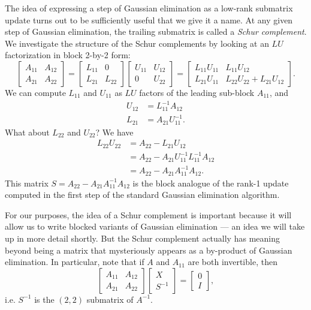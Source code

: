 \documentclass[12pt, leqno]{article} %
\begin{document}
The idea of expressing a step of Gaussian elimination as a low-rank
submatrix update turns out to be sufficiently useful that we give it
a name.  At any given step of Gaussian elimination, the trailing
submatrix is called a {\em Schur complement}.  We investigate the
structure of the Schur complements by looking at an $LU$
factorization in block 2-by-2 form:
\[
  \begin{bmatrix}
    A_{11} & A_{12} \\
    A_{21} & A_{22}
  \end{bmatrix} =
  \begin{bmatrix}
    L_{11} & 0 \\
    L_{21} & L_{22}
  \end{bmatrix}
  \begin{bmatrix}
    U_{11} & U_{12} \\
        0 & U_{22}
  \end{bmatrix} =
  \begin{bmatrix}
    L_{11} U_{11} & L_{11} U_{12} \\
    L_{21} U_{11} & L_{22} U_{22} + L_{21} U_{12}
  \end{bmatrix}.
\]
We can compute $L_{11}$ and $U_{11}$ as $LU$ factors of the leading
sub-block $A_{11}$, and
\begin{align*}
  U_{12} &= L_{11}^{-1} A_{12} \\
  L_{21} &= A_{21} U_{11}^{-1}.
\end{align*}
What about $L_{22}$ and $U_{22}$?  We have
\begin{align*}
  L_{22} U_{22}
  &= A_{22} - L_{21} U_{12} \\
  &= A_{22} - A_{21} U_{11}^{-1} L_{11}^{-1} A_{12} \\
  &= A_{22} - A_{21} A_{11}^{-1} A_{12}.
\end{align*}
This matrix $S = A_{22} - A_{21} A_{11}^{-1} A_{12}$ is the block analogue
of the rank-1 update computed in the first step of the standard
Gaussian elimination algorithm.

For our purposes, the idea of a Schur complement is important because
it will allow us to write blocked variants of Gaussian elimination ---
an idea we will take up in more detail shortly.
But the Schur complement actually has meaning beyond being a matrix that
mysteriously appears as a by-product of Gaussian elimination.
In particular, note that if $A$ and $A_{11}$ are both invertible,
then
\[
  \begin{bmatrix} A_{11} & A_{12} \\ A_{21} & A_{22} \end{bmatrix}
  \begin{bmatrix} X \\ S^{-1} \end{bmatrix} =
  \begin{bmatrix} 0 \\ I \end{bmatrix},
\]
i.e. $S^{-1}$ is the $(2,2)$ submatrix of $A^{-1}$.
\end{document}
